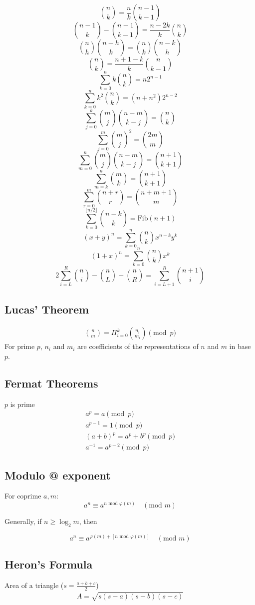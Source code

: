 \documentclass[a4paper]{article}
\begin{document}
$$
\binom{n}{k} = \frac{n}{k}\binom{n-1}{k-1}
$$
$$
\binom{n-1}{k} - \binom{n-1}{k-1} = \frac{n - 2k}{k} \binom{n}{k}
$$
$$
\binom{n}{h}\binom{n-h}{k} = \binom{n}{k}\binom{n-k}{h}
$$
$$
\binom{n}{k} = \frac{n+1-k}{k} \binom{n}{k-1}
$$
$$
\sum_{k = 0}^n k\binom{n}{k} = n 2^{n-1}
$$
$$
\sum_{k = 0}^n k^2 \binom{n}{k} = (n + n^2)2^{n-2}
$$
$$
\sum_{j = 0}^k\binom{m}{j} \binom{n-m}{k-j} = \binom{n}{k}
$$
$$
\sum_{j = 0}^m \binom{m}{j}^2 = \binom{2m}{m}
$$
$$
\sum_{m = 0}^n \binom{m}{j} \binom{n-m}{k-j} = \binom{n+1}{k+1}
$$
$$
\sum_{m = k}^n \binom{m}{k} = \binom{n+1}{k+1}
$$
$$
\sum_{r = 0}^m \binom{n+r}{r} = \binom{n+m+1}{m}
$$
$$
\sum_{k=0}^{\lfloor n/2 \rfloor} \binom{n-k}{k} = \text{Fib}(n+1)
$$
$$
(x + y)^{n} = \sum_{k=0}^{n} \binom{n}{k} x^{n-k} y^{k}
$$
$$
(1 + x)^{n} = \sum_{k=0}^{n} \binom{n}{k} x^{k}
$$
$$
2\sum_{i = L}^R \binom{n}{i} - \binom{n}{L} - \binom{n}{R} = \sum_{i = L+1}^R \binom{n+1}{i}
$$

\subsection{Lucas' Theorem}
\begin{align*}
  \binom{n}{m} = \Pi_{i=0}^{k} \binom{n_i}{m_i} \pmod{p}
\end{align*}
For prime $p$, $n_i$ and $m_i$ are coefficients of the representations of $n$ and $m$ in base $p$.

\subsection{Fermat Theorems}
$p$ is prime
\begin{align*}
  a^p = a \pmod{p} \\
  a^{p-1} = 1 \pmod{p} \\
  (a + b)^p = a^p + b^p \pmod{p} \\
  a^{-1} = a^{p-2} \pmod{p}
\end{align*}

\subsection{Modulo @ exponent}
For coprime $a, m$:
$$ a^n \equiv a^{n \text{ mod } \varphi(m)} \quad (\text{mod } m) $$

Generally, if $n \geq \log_2 m$, then

$$ a^n \equiv a^{\varphi(m) + [n \text{ mod } \varphi(m)]} \quad (\text{mod } m) $$

\subsection{Heron's Formula}
Area of a triangle ($s = \frac{a+b+c}{2}$)
\begin{align*}
  A = \sqrt{s(s-a)(s-b)(s-c)}
\end{align*}
\end{document}
